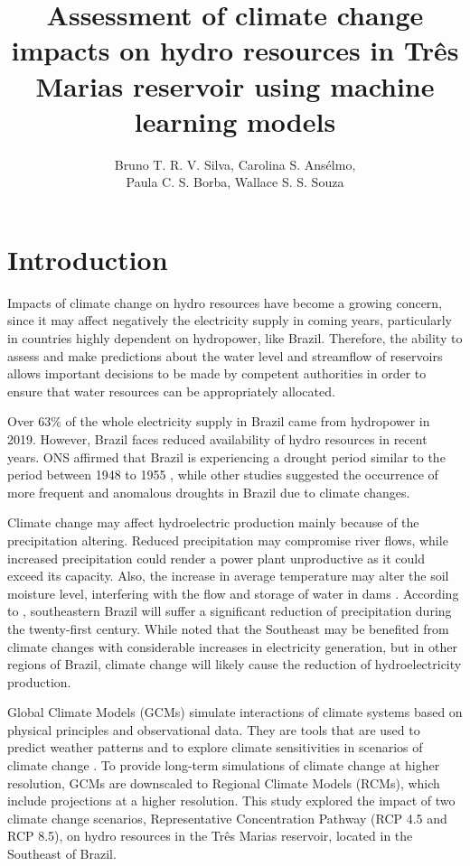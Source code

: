\documentclass[12pt]{article}
\title{Assessment of climate change impacts on hydro resources in Três Marias reservoir using machine learning models}
\author{%
    Bruno T. R. V. Silva\inst{1}, %
    Carolina S. Ansélmo\inst{1}, \\%
    Paula C. S. Borba\inst{1}, %
    Wallace S. S. Souza\inst{1}%
}
\begin{document}
\maketitle



\section{Introduction}

Impacts of climate change on hydro resources have become a growing concern, since it may affect negatively the electricity supply in coming years, particularly in countries highly dependent on hydropower, like Brazil. Therefore, the ability to assess and make predictions about the water level and streamflow of reservoirs allows important decisions to be made by competent authorities in order to ensure that water resources can be appropriately allocated.

Over 63\% of the whole electricity supply in Brazil came from hydropower in 2019. However, Brazil faces reduced availability of hydro resources in recent years. ONS affirmed that Brazil is experiencing a drought period similar to the period between 1948 to 1955 \cite{onsseca}, while other studies suggested the occurrence of more frequent and anomalous droughts in Brazil due to climate changes.

Climate change may affect hydroelectric production mainly because of the precipitation altering. Reduced precipitation may compromise river flows, while increased precipitation could render a power plant unproductive as it could exceed its capacity. Also, the increase in average temperature may alter the soil moisture level, interfering with the flow and storage of water in dams \cite{Mukheibir2013}. According to \cite{Lyra2018}, southeastern Brazil will suffer a significant reduction of precipitation during the twenty-first century. While \cite{Queiroz2016} noted that the Southeast may be benefited from climate changes with considerable increases in electricity generation, but in other regions of Brazil, climate change will likely cause the reduction of hydroelectricity production.

Global Climate Models (GCMs) simulate interactions of climate systems based on physical principles and observational data. They are tools that are used to predict weather patterns and to explore climate sensitivities in scenarios of climate change \cite{gcm}. To provide long-term simulations of climate change at higher resolution, GCMs are downscaled to Regional Climate Models (RCMs), which include projections at a higher resolution.
This study explored the impact of two climate change scenarios,  Representative Concentration Pathway (RCP 4.5 and RCP 8.5), on hydro resources in the Três Marias reservoir, located in the Southeast of Brazil.
\end{document}
